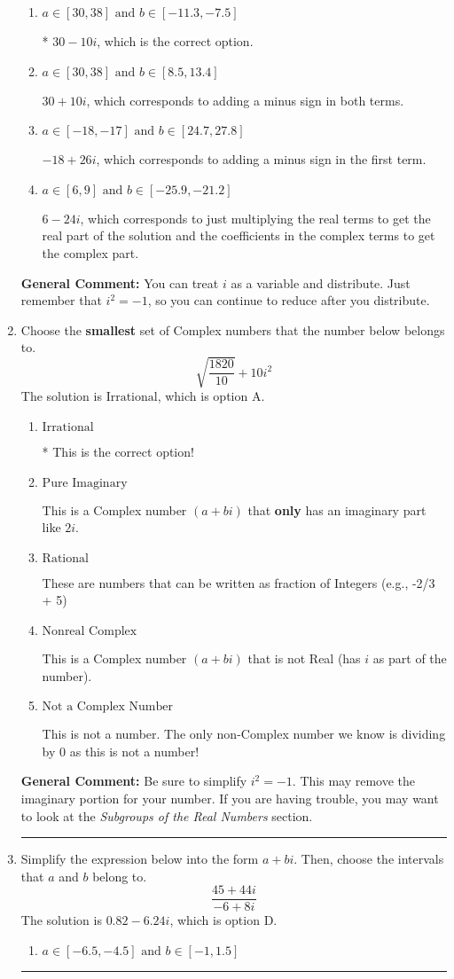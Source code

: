 \documentclass{extbook}[14pt]
\newcommand{\litem}[1]{\item #1

\rule{\textwidth}{0.4pt}}
\begin{document}
\begin{enumerate}
{\begin{enumerate}[label=\Alph*.]
 $-18 - 26 i$, which corresponds to adding a minus sign in the second term.
\item \( a \in [30, 38] \text{ and } b \in [-11.3, -7.5] \)

* $30 - 10 i$, which is the correct option.
\item \( a \in [30, 38] \text{ and } b \in [8.5, 13.4] \)

 $30 + 10 i$, which corresponds to adding a minus sign in both terms.
\item \( a \in [-18, -17] \text{ and } b \in [24.7, 27.8] \)

 $-18 + 26 i$, which corresponds to adding a minus sign in the first term.
\item \( a \in [6, 9] \text{ and } b \in [-25.9, -21.2] \)

 $6 - 24 i$, which corresponds to just multiplying the real terms to get the real part of the solution and the coefficients in the complex terms to get the complex part.
\end{enumerate}

\textbf{General Comment:} You can treat $i$ as a variable and distribute. Just remember that $i^2=-1$, so you can continue to reduce after you distribute.
}
\litem{
Choose the \textbf{smallest} set of Complex numbers that the number below belongs to.
\[ \sqrt{\frac{1820}{10}}+10i^2 \]The solution is \( \text{Irrational} \), which is option A.\begin{enumerate}[label=\Alph*.]
\item \( \text{Irrational} \)

* This is the correct option!
\item \( \text{Pure Imaginary} \)

This is a Complex number $(a+bi)$ that \textbf{only} has an imaginary part like $2i$.
\item \( \text{Rational} \)

These are numbers that can be written as fraction of Integers (e.g., -2/3 + 5)
\item \( \text{Nonreal Complex} \)

This is a Complex number $(a+bi)$ that is not Real (has $i$ as part of the number).
\item \( \text{Not a Complex Number} \)

This is not a number. The only non-Complex number we know is dividing by 0 as this is not a number!
\end{enumerate}

\textbf{General Comment:} Be sure to simplify $i^2 = -1$. This may remove the imaginary portion for your number. If you are having trouble, you may want to look at the \textit{Subgroups of the Real Numbers} section.
}
\litem{
Simplify the expression below into the form $a+bi$. Then, choose the intervals that $a$ and $b$ belong to.
\[ \frac{45 + 44 i}{-6 + 8 i} \]The solution is \( 0.82  - 6.24 i \), which is option D.\begin{enumerate}[label=\Alph*.]
\item \( a \in [-6.5, -4.5] \text{ and } b \in [-1, 1.5] \)


\end{enumerate}}
\end{enumerate}
\end{document}
